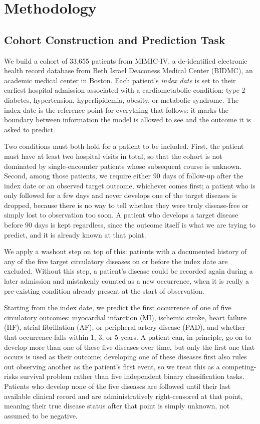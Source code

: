 \section{Methodology}

\subsection{Cohort Construction and Prediction Task}
\label{sec:cohort}

We build a cohort of 33{,}655 patients from MIMIC-IV, a de-identified electronic health record database from Beth Israel Deaconess Medical Center (BIDMC), an academic medical center in Boston. Each patient's \emph{index date} is set to their earliest hospital admission associated with a cardiometabolic condition: type 2 diabetes, hypertension, hyperlipidemia, obesity, or metabolic syndrome. The index date is the reference point for everything that follows: it marks the boundary between information the model is allowed to see and the outcome it is asked to predict.

Two conditions must both hold for a patient to be included. First, the patient must have at least two hospital visits in total, so that the cohort is not dominated by single-encounter patients whose subsequent course is unknown. Second, among those patients, we require either 90 days of follow-up after the index date or an observed target outcome, whichever comes first; a patient who is only followed for a few days and never develops one of the target diseases is dropped, because there is no way to tell whether they were truly disease-free or simply lost to observation too soon. A patient who develops a target disease before 90 days is kept regardless, since the outcome itself is what we are trying to predict, and it is already known at that point.

We apply a washout step on top of this: patients with a documented history of any of the five target circulatory diseases on or before the index date are excluded. Without this step, a patient's disease could be recorded again during a later admission and mistakenly counted as a new occurrence, when it is really a pre-existing condition already present at the start of observation.

Starting from the index date, we predict the first occurrence of one of five circulatory outcomes: myocardial infarction (MI), ischemic stroke, heart failure (HF), atrial fibrillation (AF), or peripheral artery disease (PAD), and whether that occurrence falls within 1, 3, or 5 years. A patient can, in principle, go on to develop more than one of these five diseases over time, but only the first one that occurs is used as their outcome; developing one of these diseases first also rules out observing another as the patient's first event, so we treat this as a competing-risks survival problem rather than five independent binary classification tasks. Patients who develop none of the five diseases are followed until their last available clinical record and are administratively right-censored at that point, meaning their true disease status after that point is simply unknown, not assumed to be negative.

